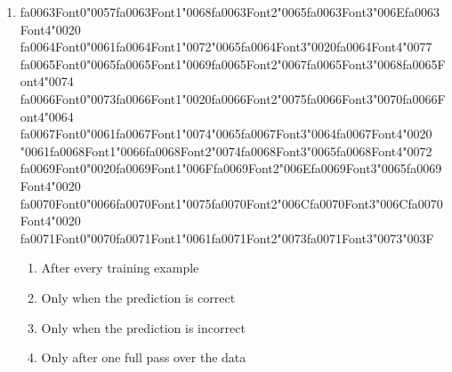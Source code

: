 \documentclass[12pt]{article}
\begin{document}
\begin{enumerate}[label=Q\arabic*.]
\item {\csname fa0063Font0\endcsname\char"0057}{\csname fa0063Font1\endcsname\char"0068}{\csname fa0063Font2\endcsname\char"0065}{\csname fa0063Font3\endcsname\char"006E}{\csname fa0063Font4\endcsname\char"0020} {\csname fa0064Font0\endcsname\char"0061}{\csname fa0064Font1\endcsname\char"0072}{\char"0065}{\csname fa0064Font3\endcsname\char"0020}{\csname fa0064Font4\endcsname\char"0077} {\csname fa0065Font0\endcsname\char"0065}{\csname fa0065Font1\endcsname\char"0069}{\csname fa0065Font2\endcsname\char"0067}{\csname fa0065Font3\endcsname\char"0068}{\csname fa0065Font4\endcsname\char"0074} {\csname fa0066Font0\endcsname\char"0073}{\csname fa0066Font1\endcsname\char"0020}{\csname fa0066Font2\endcsname\char"0075}{\csname fa0066Font3\endcsname\char"0070}{\csname fa0066Font4\endcsname\char"0064} {\csname fa0067Font0\endcsname\char"0061}{\csname fa0067Font1\endcsname\char"0074}{\char"0065}{\csname fa0067Font3\endcsname\char"0064}{\csname fa0067Font4\endcsname\char"0020} {\char"0061}{\csname fa0068Font1\endcsname\char"0066}{\csname fa0068Font2\endcsname\char"0074}{\csname fa0068Font3\endcsname\char"0065}{\csname fa0068Font4\endcsname\char"0072} {\csname fa0069Font0\endcsname\char"0020}{\csname fa0069Font1\endcsname\char"006F}{\csname fa0069Font2\endcsname\char"006E}{\csname fa0069Font3\endcsname\char"0065}{\csname fa0069Font4\endcsname\char"0020} {\csname fa0070Font0\endcsname\char"0066}{\csname fa0070Font1\endcsname\char"0075}{\csname fa0070Font2\endcsname\char"006C}{\csname fa0070Font3\endcsname\char"006C}{\csname fa0070Font4\endcsname\char"0020} {\csname fa0071Font0\endcsname\char"0070}{\csname fa0071Font1\endcsname\char"0061}{\csname fa0071Font2\endcsname\char"0073}{\csname fa0071Font3\endcsname\char"0073}{\char"003F}
\begin{enumerate}[label=(\Alph*)]
    \item After every training example
    \item Only when the prediction is correct
    \item Only when the prediction is incorrect
    \item Only after one full pass over the data
\end{enumerate}

\end{enumerate}
\end{document}
